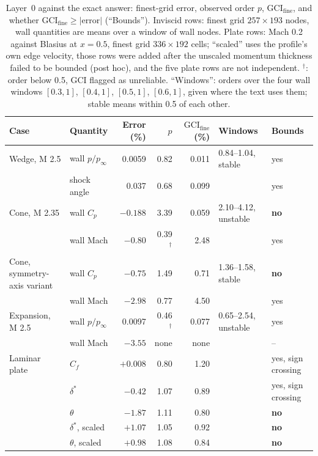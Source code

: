 \documentclass[twocolumn]{labreport}
\newcommand{\Cp}{C_p}
\newcommand{\pinf}{p_\infty}
\newcommand{\fine}{\mathrm{fine}}
\newcommand{\tick}{yes}
\newcommand{\cross}{\textbf{no}}
\begin{document}
\begin{table}[t]
\centering
\caption{Layer~0 against the exact answer: finest-grid error, observed order $p$, $\mathrm{GCI}_\fine$, and whether $\mathrm{GCI}_\fine\ge|\text{error}|$ (``Bounds'').
Inviscid rows: finest grid $257\times193$ nodes, wall quantities are means over a window of wall nodes. Plate rows: Mach 0.2 against Blasius at $x=0.5$, finest grid $336\times192$ cells; ``scaled'' uses the profile's own edge velocity, those rows were added after the unscaled momentum thickness failed to be bounded (post hoc), and the five plate rows are not independent.
$^\dagger$: order below 0.5, GCI flagged as unreliable. ``Windows'': orders over the four wall windows $[0.3,1]$, $[0.4,1]$, $[0.5,1]$, $[0.6,1]$, given where the text uses them; stable means within 0.5 of each other.}
\label{tab:l0}
\begin{tabular}{@{}llrrrll@{}}
\toprule
Case & Quantity & Error (\%) & $p$ & $\mathrm{GCI}_\fine$ (\%) & Windows & Bounds \\
\midrule
Wedge, M 2.5 & wall $p/\pinf$ & 0.0059 & 0.82 & 0.011 & 0.84--1.04, stable & \tick \\
 & shock angle & 0.037 & 0.68 & 0.099 & & \tick \\
Cone, M 2.35 & wall $\Cp$ & $-0.188$ & 3.39 & 0.059 & 2.10--4.12, unstable & \cross \\
 & wall Mach & $-0.80$ & 0.39$^\dagger$ & 2.48 & & \tick \\
Cone, symmetry-axis variant & wall $\Cp$ & $-0.75$ & 1.49 & 0.71 & 1.36--1.58, stable & \cross \\
 & wall Mach & $-2.98$ & 0.77 & 4.50 & & \tick \\
Expansion, M 2.5 & wall $p/\pinf$ & 0.0097 & 0.46$^\dagger$ & 0.077 & 0.65--2.54, unstable & \tick \\
 & wall Mach & $-3.55$ & none & none & & -- \\
\midrule
Laminar plate & $C_f$ & $+0.008$ & 0.80 & 1.20 & & \tick, sign crossing \\
 & $\delta^*$ & $-0.42$ & 1.07 & 0.89 & & \tick, sign crossing \\
 & $\theta$ & $-1.87$ & 1.11 & 0.80 & & \cross \\
 & $\delta^*$, scaled & $+1.07$ & 1.05 & 0.92 & & \cross \\
 & $\theta$, scaled & $+0.98$ & 1.08 & 0.84 & & \cross \\
\bottomrule
\end{tabular}
\end{table}
\end{document}
